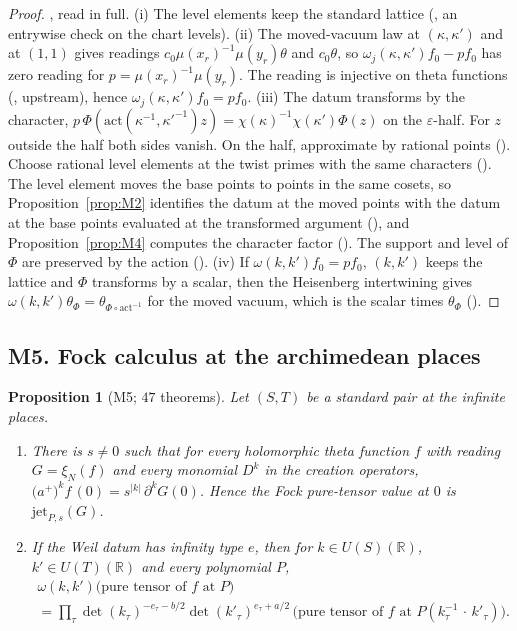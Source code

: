 \documentclass[11pt]{article}
\newtheorem{proposition}[theorem]{Proposition}
\theoremstyle{remark}
\begin{document}
\begin{proof}
, read in full. (i) The level elements keep the standard lattice (, an entrywise check on the chart levels). (ii) The moved-vacuum law at $(\kappa,\kappa')$ and at $(1,1)$ gives readings $c_0\mu(x_r)^{-1}\mu(y_r)\theta$ and $c_0\theta$, so $\omega_j(\kappa,\kappa')f_0-pf_0$ has zero reading for $p=\mu(x_r)^{-1}\mu(y_r)$. The reading is injective on theta functions (, upstream), hence $\omega_j(\kappa,\kappa')f_0=pf_0$. (iii) The datum transforms by the character, $p\,\Phi(\mathrm{act}(\kappa^{-1},\kappa'^{-1})z)=\chi(\kappa)^{-1}\chi(\kappa')\Phi(z)$ on the $\varepsilon$-half. For $z$ outside the half both sides vanish. On the half, approximate by rational points (). Choose rational level elements at the twist primes with the same characters (). The level element moves the base points to points in the same cosets, so Proposition~\ref{prop:M2} identifies the datum at the moved points with the datum at the base points evaluated at the transformed argument (), and Proposition~\ref{prop:M4} computes the character factor (). The support and level of $\Phi$ are preserved by the action (). (iv) If $\omega(k,k')f_0=pf_0$, $(k,k')$ keeps the lattice and $\Phi$ transforms by a scalar, then the Heisenberg intertwining gives $\omega(k,k')\theta_\Phi=\theta_{\Phi\circ\mathrm{act}^{-1}}$ for the moved vacuum, which is the scalar times $\theta_\Phi$ ().
\end{proof}

\subsection{M5. Fock calculus at the archimedean places}

\begin{proposition}[M5; $47$ theorems]\label{prop:M5}
Let $(S,T)$ be a standard pair at the infinite places.
\begin{enumerate}[label=(\alph*),itemsep=1pt]
\item There is $s\neq0$ such that for every holomorphic theta function $f$ with reading $G=\xi_N(f)$ and every monomial $D^k$ in the creation operators, $\bigl(a^+\bigr)^kf\,(0)=s^{\lvert k\rvert}\,\partial^kG(0)$. Hence the Fock pure-tensor value at $0$ is $\mathrm{jet}_{P,s}(G)$.
\item If the Weil datum has infinity type $e$, then for $k\in U(S)(\mathbb R)$, $k'\in U(T)(\mathbb R)$ and every polynomial $P$,
\begin{multline*}
\omega(k,k')\bigl(\text{pure tensor of }f\text{ at }P\bigr)\\
=\prod_\tau\det(k_\tau)^{-e_\tau-b/2}\det(k'_\tau)^{e_\tau+a/2}\,\bigl(\text{pure tensor of }f\text{ at }P(k_\tau^{-1}\,\cdot\,k'_\tau)\bigr).
\end{multline*}
\end{enumerate}
\end{proposition}
\end{document}
